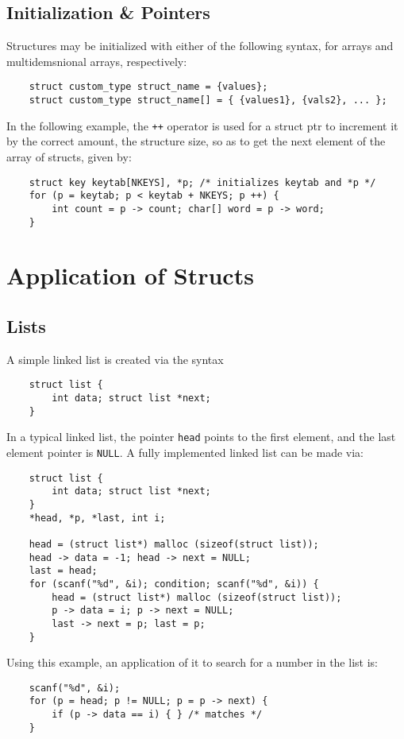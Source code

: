 \documentclass{tufte-book}
\begin{document}
\begin{fullwidth}
\section{Initialization \& Pointers}
Structures may be initialized with either of the following syntax, for arrays and multidemsnional arrays, respectively:
\begin{lstlisting}
    struct custom_type struct_name = {values};
    struct custom_type struct_name[] = { {values1}, {vals2}, ... };
\end{lstlisting}
In the following example, the \lstinline{++} operator is used for a struct ptr to increment it by the correct amount, the structure size, so as to get the next element of the array of structs, given by:
\begin{lstlisting}
    struct key keytab[NKEYS], *p; /* initializes keytab and *p */
    for (p = keytab; p < keytab + NKEYS; p ++) {
        int count = p -> count; char[] word = p -> word;
    }
\end{lstlisting}

\chapter{Application of Structs}

\section{Lists}
A simple linked list is created via the syntax
\begin{lstlisting}
    struct list {
        int data; struct list *next;
    }
\end{lstlisting}
In a typical linked list, the pointer \lstinline{head} points to the first element, and the last element pointer is \lstinline{NULL}. A fully implemented linked list can be made via:
\begin{lstlisting}
    struct list {
        int data; struct list *next;
    }
    *head, *p, *last, int i;

    head = (struct list*) malloc (sizeof(struct list));
    head -> data = -1; head -> next = NULL;
    last = head;
    for (scanf("%d", &i); condition; scanf("%d", &i)) {
        head = (struct list*) malloc (sizeof(struct list));
        p -> data = i; p -> next = NULL;
        last -> next = p; last = p;
    }
\end{lstlisting}
Using this example, an application of it to search for a number in the list is:
\begin{lstlisting}
    scanf("%d", &i);
    for (p = head; p != NULL; p = p -> next) {
        if (p -> data == i) { } /* matches */
    }
\end{lstlisting}


\end{fullwidth}
\end{document}
